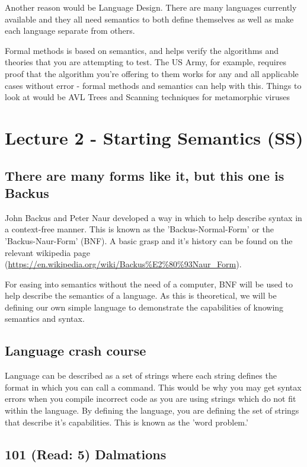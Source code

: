 \documentclass[12pt]{article}
\begin{document}
Another reason would be Language Design.  There are many languages currently
available and they all need semantics to both define themselves as well as
make each language separate from others.

Formal methods is based on semantics, and helps verify the algorithms and
theories that you are attempting to test.  The US Army, for example, requires
proof that the algorithm you're offering to them works for any and all
applicable cases without error - formal methods and semantics can help with
this.  Things to look at would be AVL Trees and Scanning techniques for
metamorphic viruses

\section{Lecture 2 - Starting Semantics (SS)}
\label{sec-2}
\subsection{There are many forms like it, but this one is Backus}
\label{sec-2-1}
John Backus and Peter Naur developed a way in which to help describe syntax in
a context-free manner.  This is known as the 'Backus-Normal-Form' or the
'Backus-Naur-Form' (BNF).  A basic grasp and it's history can be found on the
relevant wikipedia page
(\url{https://en.wikipedia.org/wiki/Backus\%E2\%80\%93Naur_Form}).

For easing into semantics without the need of a computer, BNF will be used to
help describe the semantics of a language.  As this is theoretical, we will be
defining our own simple language to demonstrate the capabilities of knowing
semantics and syntax.

\subsection{Language crash course}
\label{sec-2-2}
Language can be described as a set of strings where each string defines the
format in which you can call a command.  This would be why you may get syntax
errors when you compile incorrect code as you are using strings which do not
fit within the language.  By defining the language, you are defining the set
of strings that describe it's capabilities.  This is known as the 'word
problem.'

\subsection{101 (Read: 5) Dalmations}
\label{sec-2-3}
\end{document}
